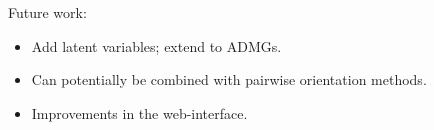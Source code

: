 \documentclass{uai2025} %
\begin{document}
Future work:
\begin{itemize}
	\item Add latent variables; extend to ADMGs.
	\item Can potentially be combined with pairwise orientation methods.
	\item Improvements in the web-interface.
\end{itemize}



\newpage


\end{document}
